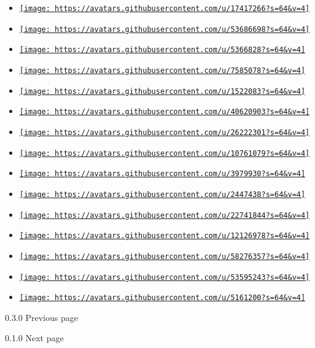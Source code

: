 \begin{itemize}
\item
  \href{https://github.com/asibahi}{\texttt{[image: https://avatars.githubusercontent.com/u/17417266?s=64\&v=4]}}
\item
  \href{https://github.com/astrale-sharp}{\texttt{[image: https://avatars.githubusercontent.com/u/53686698?s=64\&v=4]}}
\item
  \href{https://github.com/classabbyamp}{\texttt{[image: https://avatars.githubusercontent.com/u/5366828?s=64\&v=4]}}
\item
  \href{https://github.com/cmoog}{\texttt{[image: https://avatars.githubusercontent.com/u/7585078?s=64\&v=4]}}
\item
  \href{https://github.com/felipeacsi}{\texttt{[image: https://avatars.githubusercontent.com/u/1522083?s=64\&v=4]}}
\item
  \href{https://github.com/figsoda}{\texttt{[image: https://avatars.githubusercontent.com/u/40620903?s=64\&v=4]}}
\item
  \href{https://github.com/ichxorya}{\texttt{[image: https://avatars.githubusercontent.com/u/26222301?s=64\&v=4]}}
\item
  \href{https://github.com/jakobrs}{\texttt{[image: https://avatars.githubusercontent.com/u/10761079?s=64\&v=4]}}
\item
  \href{https://github.com/michidk}{\texttt{[image: https://avatars.githubusercontent.com/u/3979930?s=64\&v=4]}}
\item
  \href{https://github.com/radimsuckr}{\texttt{[image: https://avatars.githubusercontent.com/u/2447438?s=64\&v=4]}}
\item
  \href{https://github.com/rqy2002}{\texttt{[image: https://avatars.githubusercontent.com/u/22741844?s=64\&v=4]}}
\item
  \href{https://github.com/s-zymon}{\texttt{[image: https://avatars.githubusercontent.com/u/12126978?s=64\&v=4]}}
\item
  \href{https://github.com/tbethe}{\texttt{[image: https://avatars.githubusercontent.com/u/58276357?s=64\&v=4]}}
\item
  \href{https://github.com/teenjuna}{\texttt{[image: https://avatars.githubusercontent.com/u/53595243?s=64\&v=4]}}
\item
  \href{https://github.com/viddrobnic}{\texttt{[image: https://avatars.githubusercontent.com/u/5161200?s=64\&v=4]}}
\end{itemize}

\href{/docs/changelog/0.3.0/}{\pandocbounded{}}

{ 0.3.0 } { Previous page }

\href{/docs/changelog/0.1.0/}{\pandocbounded{}}

{ 0.1.0 } { Next page }
